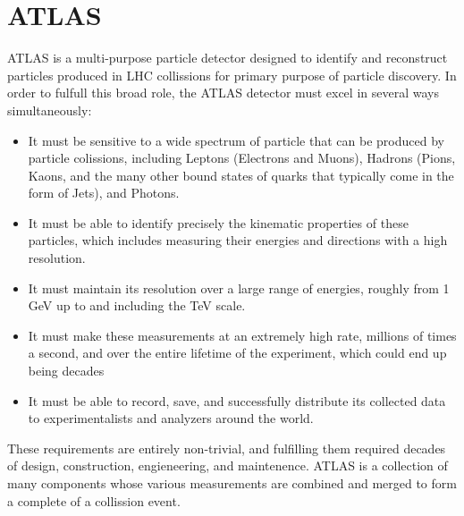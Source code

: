 %
%
%

\section{ATLAS}
ATLAS is a multi-purpose particle detector designed to identify and reconstruct particles produced in LHC collissions for primary purpose of particle discovery.
In order to fulfull this broad role, the ATLAS detector must excel in several ways simultaneously:

\begin{itemize}
  \item It must be sensitive to a wide spectrum of particle that can be produced by particle colissions, including Leptons (Electrons and Muons), Hadrons (Pions, Kaons, and the many other bound states of quarks that typically come in the form of Jets), and Photons.
  \item It must be able to identify precisely the kinematic properties of these particles, which includes measuring their energies and directions with a high resolution.
  \item It must maintain its resolution over a large range of energies, roughly from 1 GeV up to and including the TeV scale.
  \item It must make these measurements at an extremely high rate, millions of times a second, and over the entire lifetime of the experiment, which could end up being decades
  \item It must be able to record, save, and successfully distribute its collected data to experimentalists and analyzers around the world.
\end{itemize}

These requirements are entirely non-trivial, and fulfilling them required decades of design, construction, engieneering, and maintenence.  
ATLAS is a collection of many components whose various measurements are combined and merged to form a complete of a collission event.




